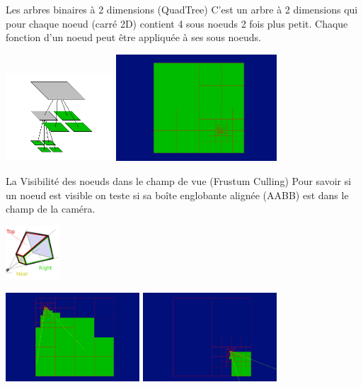 \documentclass{beamer}
\begin{document}
\begin{frame}{Les arbres binaires à 2 dimensions (QuadTree)}
  C'est un arbre à 2 dimensions qui pour chaque noeud (carré 2D) contient 4 sous noeuds 2 fois plus petit.
  Chaque fonction d'un noeud peut être appliquée à ses sous noeuds.
  \begin{center}
    \includegraphics[width=4cm]{picture_quadtree.png}
    \includegraphics[width=6cm]{terrain_quadtree.png}
  \end{center}
\end{frame}

\begin{frame}{La Visibilité des noeuds dans le champ de vue (Frustum Culling)}
    Pour savoir si un noeud est visible on teste si sa boîte englobante alignée (AABB) est dans le champ de la caméra.
    \begin{center}
      \includegraphics[width=2cm]{frustum_culling_cone.png}
    \end{center}
    \begin{center}
      \includegraphics[width=5cm]{terrain_culling_0.png}
      \includegraphics[width=5cm]{terrain_culling_1.png}
    \end{center}   
\end{frame}
\end{document}
